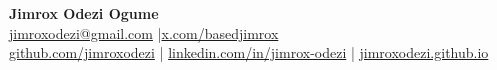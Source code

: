 \begin{center}
  {\LARGE \textbf{Jimrox Odezi Ogume}} \\[2pt]
  \href{mailto:jimroxodezi@gmail.com}{jimroxodezi@gmail.com}
  \quad|\quad \href{https://x.com/basedjimrox}{x.com/basedjimrox} \\
  \href{https://github.com/jimroxodezi}{github.com/jimroxodezi} \quad|\quad
  \href{https://www.linkedin.com/in/jimrox-odezi-376658173/}{linkedin.com/in/jimrox-odezi} \quad|\quad
  \href{https://jimroxodezi.github.io}{jimroxodezi.github.io}
\end{center}
